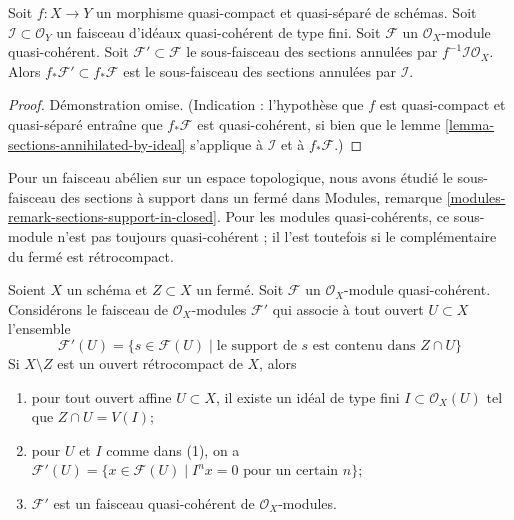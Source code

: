 \begin{lemma}
\label{lemma-push-sections-annihilated-by-ideal}
Soit $f : X \to Y$ un morphisme quasi-compact et quasi-séparé de
schémas. Soit $\mathcal{I} \subset \mathcal{O}_Y$ un faisceau
d'idéaux quasi-cohérent de type fini. Soit $\mathcal{F}$ un
$\mathcal{O}_X$-module quasi-cohérent. Soit $\mathcal{F}' \subset \mathcal{F}$
le sous-faisceau des sections annulées par $f^{-1}\mathcal{I}\mathcal{O}_X$.
Alors $f_*\mathcal{F}' \subset f_*\mathcal{F}$ est le
sous-faisceau des sections annulées par $\mathcal{I}$.
\end{lemma}

\begin{proof}
Démonstration omise. (Indication : l'hypothèse que $f$ est quasi-compact
et quasi-séparé entraîne que $f_*\mathcal{F}$ est quasi-cohérent, si
bien que le lemme \ref{lemma-sections-annihilated-by-ideal} s'applique
à $\mathcal{I}$ et à $f_*\mathcal{F}$.)
\end{proof}

\noindent
Pour un faisceau abélien sur un espace topologique, nous avons étudié le
sous-faisceau des sections à support dans un fermé dans
Modules, remarque \ref{modules-remark-sections-support-in-closed}.
Pour les modules quasi-cohérents, ce sous-module n'est pas toujours
quasi-cohérent ; il l'est toutefois si le complémentaire du fermé est
rétrocompact.

\begin{lemma}
\label{lemma-sections-supported-on-closed-subset}
Soient $X$ un schéma et $Z \subset X$ un fermé.
Soit $\mathcal{F}$ un $\mathcal{O}_X$-module
quasi-cohérent. Considérons le faisceau de $\mathcal{O}_X$-modules $\mathcal{F}'$
qui associe à tout ouvert $U \subset X$ l'ensemble
$$
\mathcal{F}'(U)
=
\{s \in \mathcal{F}(U) \mid
\text{le support de }s\text{ est contenu dans }Z \cap U\}
$$
Si $X \setminus Z$ est un ouvert rétrocompact de $X$, alors
\begin{enumerate}
\item pour tout ouvert affine $U \subset X$, il existe un idéal de type
fini $I \subset \mathcal{O}_X(U)$ tel que $Z \cap U = V(I)$;
\item pour $U$ et $I$ comme dans (1), on a
$\mathcal{F}'(U) = \{x \in \mathcal{F}(U) \mid
I^nx = 0 \text{ pour un certain } n\}$;
\item $\mathcal{F}'$ est un faisceau quasi-cohérent de $\mathcal{O}_X$-modules.
\end{enumerate}
\end{lemma}

